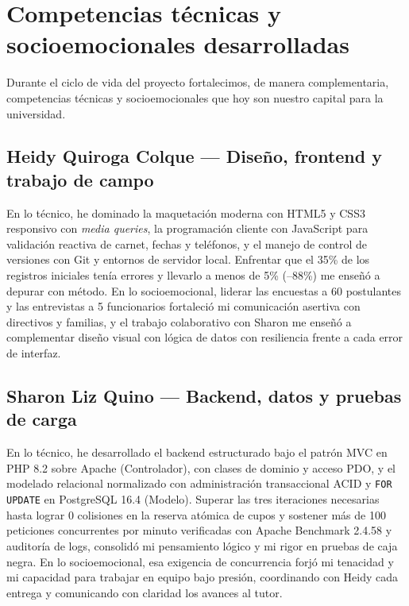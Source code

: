 \section{Competencias técnicas y socioemocionales desarrolladas}
\label{sec:competencias_desarrolladas}

Durante el ciclo de vida del proyecto fortalecimos, de manera complementaria, competencias técnicas y socioemocionales que hoy son nuestro capital para la universidad.

\subsection{Heidy Quiroga Colque --- Diseño, frontend y trabajo de campo}
En lo técnico, he dominado la maquetación moderna con HTML5 y CSS3 responsivo con \textit{media queries}, la programación cliente con JavaScript para validación reactiva de carnet, fechas y teléfonos, y el manejo de control de versiones con Git y entornos de servidor local. Enfrentar que el 35\% de los registros iniciales tenía errores y llevarlo a menos de 5\% (--88\%) me enseñó a depurar con método. En lo socioemocional, liderar las encuestas a 60 postulantes y las entrevistas a 5 funcionarios fortaleció mi comunicación asertiva con directivos y familias, y el trabajo colaborativo con Sharon me enseñó a complementar diseño visual con lógica de datos con resiliencia frente a cada error de interfaz.

\subsection{Sharon Liz Quino --- Backend, datos y pruebas de carga}
En lo técnico, he desarrollado el backend estructurado bajo el patrón MVC en PHP 8.2 sobre Apache (Controlador), con clases de dominio y acceso PDO, y el modelado relacional normalizado con administración transaccional ACID y \texttt{FOR UPDATE} en PostgreSQL 16.4 (Modelo). Superar las tres iteraciones necesarias hasta lograr 0 colisiones en la reserva atómica de cupos y sostener más de 100 peticiones concurrentes por minuto verificadas con Apache Benchmark 2.4.58 y auditoría de logs, consolidó mi pensamiento lógico y mi rigor en pruebas de caja negra. En lo socioemocional, esa exigencia de concurrencia forjó mi tenacidad y mi capacidad para trabajar en equipo bajo presión, coordinando con Heidy cada entrega y comunicando con claridad los avances al tutor.

